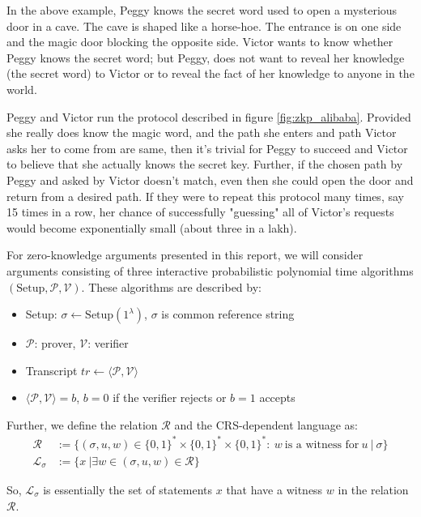 In the above example, Peggy knows the secret word used to open a mysterious door in a cave. The cave is shaped like a horse-hoe. The entrance is on one side and the magic door blocking the opposite side. Victor wants to know whether Peggy knows the secret word; but Peggy, does not want to reveal her knowledge (the secret word) to Victor or to reveal the fact of her knowledge to anyone in the world. 

Peggy and Victor run the protocol described in figure \ref{fig:zkp_alibaba}. Provided she really does know the magic word, and the path she enters and path Victor asks her to come from are same, then it's trivial for Peggy to succeed and Victor to believe that she actually knows the secret key. Further, if the chosen path by Peggy and asked by Victor doesn't match, even then she could open the door and return from a desired path. If they were to repeat this protocol many times, say 15 times in a row, her chance of successfully "guessing" all of Victor's requests would become exponentially small (about three in a lakh).

For zero-knowledge arguments presented in this report, we will consider arguments consisting of three interactive probabilistic polynomial time algorithms $(\text{Setup}, \mathcal{P}, \mathcal{V})$. These algorithms are described by:
\begin{itemize}[label=$\ast$]
    \item Setup: $\sigma \leftarrow \text{Setup}(1^{\lambda})$, $\sigma$ is common reference string
    \item $\mathcal{P}$: prover, $\mathcal{V}$: verifier
    \item Transcript $tr \leftarrow \langle \mathcal{P}, \mathcal{V} \rangle$
    \item $\langle \mathcal{P}, \mathcal{V} \rangle = b$, $b=0$ if the verifier rejects or $b=1$ accepts 
\end{itemize}

Further, we define the relation $\mathcal{R}$ and the CRS-dependent language as:
\begin{align*}
    \mathcal{R} &:= \{ (\sigma, u, w) \in \{0,1\}^{\ast} \times  \{0,1\}^{\ast} \times  \{0,1\}^{\ast}: \ w \ \text{is a witness for}\ u \ | \ \sigma \}\\
    \mathcal{L}_{\sigma} &:=  \{ x \ | \exists w \in (\sigma, u, w) \in \mathcal{R} \}
\end{align*}

So, $\mathcal{L}_{\sigma}$ is essentially the set of statements $x$ that have a witness $w$ in the relation $\mathcal{R}$. 

